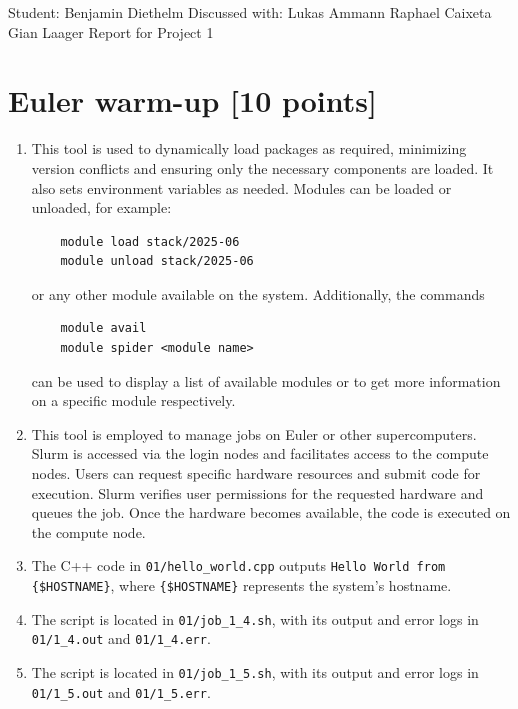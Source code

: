\documentclass[unicode,10pt,a4paper,oneside,numbers=endperiod,openany]{scrartcl}
\begin{document}
\setassignment
{}

            {Student: Benjamin Diethelm}
            {Discussed with: Lukas Ammann \linebreak \null\hfill Raphael Caixeta \linebreak \null\hfill Gian Laager}
            {Report for Project 1}{}
\newline



\section{Euler warm-up [10 points]}

\begin{enumerate}
\item This tool is used to dynamically load packages as required, minimizing version conflicts and ensuring only the necessary components are loaded. It also sets environment variables as needed. Modules can be loaded or unloaded, for example: \begin{lstlisting}
    module load stack/2025-06
    module unload stack/2025-06
\end{lstlisting}
 or any other module available on the system. Additionally, the commands \begin{lstlisting}
    module avail
    module spider <module name>
\end{lstlisting}
 can be used to display a list of available modules or to get more information on a specific module respectively.


\item This tool is employed to manage jobs on Euler or other supercomputers. Slurm is accessed via the login nodes and facilitates access to the compute nodes. Users can request specific hardware resources and submit code for execution. Slurm verifies user permissions for the requested hardware and queues the job. Once the hardware becomes available, the code is executed on the compute node.


\item The C++ code in \texttt{01/hello\_world.cpp} outputs \texttt{Hello World from \{\$HOSTNAME\}}, where \texttt{\{\$HOSTNAME\}} represents the system's hostname.


\item The script is located in \texttt{01/job\_1\_4.sh}, with its output and error logs in \texttt{01/1\_4.out} and \texttt{01/1\_4.err}.


\item The script is located in \texttt{01/job\_1\_5.sh}, with its output and error logs in \texttt{01/1\_5.out} and \texttt{01/1\_5.err}.
\end{enumerate}
\end{document}
